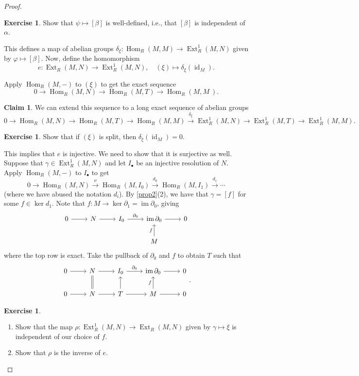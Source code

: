\documentclass[10pt,letterpaper,cm]{nupset}
\theoremstyle{definition}
\theoremstyle{theorem}
\newtheorem*{claim}{Claim}
\newtheorem{exercise}[definition]{Exercise}
\theoremstyle{remark}
\newcommand{\1}{\mathbf{1}}
\newcommand{\0}{\vec 0}
\DeclareMathOperator{\id}{id}
\DeclareMathOperator{\ext}{Ext}
\DeclareMathOperator{\im}{im}
\DeclareMathOperator{\Hom}{Hom}
\begin{document}
\begin{proof}
\begin{exercise}
Show that $\psi \mapsto \left[\beta\right]$ is well-defined, i.e., that $\left[\beta\right]$ is independent of $\alpha$. 
\end{exercise} 
This defines a map of abelian groups $\delta_{\xi}: \Hom_R(M, M) \to \ext^1_R(M, N)$ given by $\varphi \mapsto [\beta]$. Now, define the homomorphism $$e: \ext_R(M, N) \to \ext^1_R(M , N), \quad (\xi) \mapsto \delta_{\xi}(\id_M).$$

Apply $\Hom_R(M, -)$ to $\left(\xi\right)$ to get the exact sequence 
\[
0 \to \Hom_R(M, N) \to \Hom_R(M, T) \to \Hom_R(M, M\
)  . 
\]
\begin{claim}   
We can extend this sequence to a long exact sequence of abelian groups $$0 \to \Hom_R(M, N) \to \Hom_R(M, T) \to \Hom_R(M, M)  \overset{\delta_{\xi}}{\longrightarrow} \ext^1_R(M, N) \to \ext^1_R(M, T) \to \ext^1_R(M, M).$$
\end{claim}
\begin{exercise}
Show that if $\left(\xi\right)$ is split, then $\delta_{\xi}(\id_M) =0$.
\end{exercise} 
This implies that  $e$ is injective.\reversemarginpar{} We need to show that it is surjective as well. Suppose that $\gamma \in \ext_R^1(M, N)$ and let $I_{\bullet}$ be an injective resolution of $N$. Apply $\Hom_R(M, -)$ to $I_{\bullet}$ to get $$0 \to \Hom_R(M, N) \overset{\nu}{\longrightarrow} \Hom_R(M, I_0) \overset{d_0}{\longrightarrow} \Hom_R(M, I_1) \overset{d_1}{\longrightarrow} \cdots   $$ (where we have abused the notation $d_i$). 
By \cref{prop2}(2), we have that $\gamma = [f]$ for some $f\in \ker{d_1}$. Note that $f: M \to \ker{\partial_1} = \im{\partial_0}$, giving 
\[ \begin{tikzcd}
0 \arrow[r] & N \arrow[r] & I_0 \arrow[r, "\partial_0"] & \im{\partial_0} \arrow[r] & 0 \\
 &  &  & M \arrow[u, "f"] & 
\end{tikzcd}
\] where the top row is exact. Take the pullback of $\partial_0$ and $f$ to obtain $T$ such that
\[
\begin{tikzcd}
0 \arrow[r] & N \arrow[r] & I_0 \arrow[r, "\partial_0"] & \im{\partial_0} \arrow[r] & 0 \\
0 \arrow[r] & N \arrow[r] \arrow[u, equal] & T \arrow[r] \arrow[u] & M \arrow[u, "f"] \arrow[r] & 0
\end{tikzcd}
.\]
\begin{exercise} $ $
\begin{enumerate}
\item Show that the map $\rho: \ext_R^1(M, N) \to \ext_R(M, N)$ given by $\gamma \mapsto \xi$ is independent of our choice of $f$.  
\item Show that $\rho$ is the inverse of  $e$.
\end{enumerate}
\end{exercise}
\end{proof}
\end{document}
